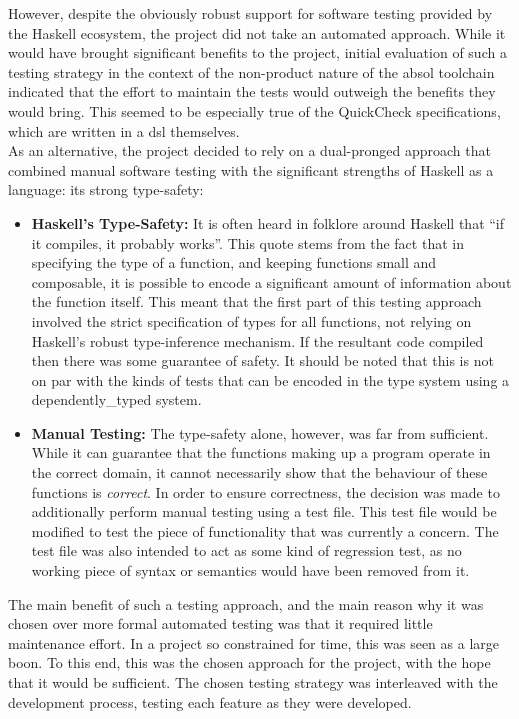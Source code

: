 However, despite the obviously robust support for software testing provided by the Haskell ecosystem, the project did not take an automated approach.
While it would have brought significant benefits to the project, initial evaluation of such a testing strategy in the context of the non-product nature of the \gls{absol} toolchain indicated that the effort to maintain the tests would outweigh the benefits they would bring.
This seemed to be especially true of the QuickCheck specifications, which are written in a \gls{dsl} themselves. \\

As an alternative, the project decided to rely on a dual-pronged approach that combined manual software testing with the significant strengths of Haskell as a language: its strong type-safety:
\begin{itemize}
    \item \textbf{Haskell's Type-Safety:} It is often heard in folklore around Haskell that ``if it compiles, it probably works''. 
    This quote stems from the fact that in specifying the type of a function, and keeping functions small and composable, it is possible to encode a significant amount of information about the function itself.
    This meant that the first part of this testing approach involved the strict specification of types for all functions, not relying on Haskell's robust type-inference mechanism.
    If the resultant code compiled then there was some guarantee of safety.
    It should be noted that this is not on par with the kinds of tests that can be encoded in the type system using a \gls{dependently_typed} system.
    \item \textbf{Manual Testing:} The type-safety alone, however, was far from sufficient. 
    While it can guarantee that the functions making up a program operate in the correct domain, it cannot necessarily show that the behaviour of these functions is \textit{correct}.
    In order to ensure correctness, the decision was made to additionally perform manual testing using a test file.
    This test file would be modified to test the piece of functionality that was currently a concern.
    The test file was also intended to act as some kind of regression test, as no working piece of syntax or semantics would have been removed from it. 
\end{itemize}

The main benefit of such a testing approach, and the main reason why it was chosen over more formal automated testing was that it required little maintenance effort.
In a project so constrained for time, this was seen as a large boon. 
To this end, this was the chosen approach for the project, with the hope that it would be sufficient. 
The chosen testing strategy was interleaved with the development process, testing each feature as they were developed. 

